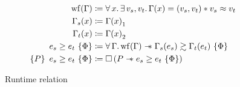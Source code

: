 \begin{figure}[tp]
    \begin{align*}
        	\wf{\datalangBisubst}
    		& \coloneqq
    		\forall \datalangVar \ldotp
    		\exists \datalangVal_s, \datalangVal_t \ldotp
    		\datalangBisubst (\datalangVar) = (\datalangVal_s, \datalangVal_t) \iSep
    		\datalangVal_s \iSimilar \datalangVal_t
    	\\
            \datalangBisubst_s (\datalangVar)
            & \coloneqq
            {\datalangBisubst (\datalangVar)}_1
        \\
            \datalangBisubst_t (\datalangVar)
            & \coloneqq
            {\datalangBisubst (\datalangVar)}_2
        \\
    		\iRsimv{\iPred}{\datalangExpr_s}{\datalangExpr_t}
    		& \coloneqq
    		\forall \datalangBisubst \ldotp
    		\wf{\datalangBisubst} \iWand
    		\iSimv{\iPred}{\datalangBisubst_s (\datalangExpr_s)}{\datalangBisubst_t (\datalangExpr_t)}
    	\\
    	   \iRsimvHoare{P}{\iPred}{\datalangExpr_s}{\datalangExpr_t}
    	   & \coloneqq
    	   \iPersistent \left( P \iWand \iRsimv{\iPred}{\datalangExpr_s}{\datalangExpr_t} \right)
    \end{align*}
    \caption{Runtime relation}
    \label{fig:rsim}
\end{figure}